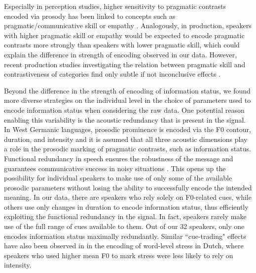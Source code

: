 Especially in perception studies, higher sensitivity to pragmatic contrasts encoded via prosody has been linked to concepts such as pragmatic/communicative skill or empathy \citep{bishopPhonologyPhoneticsSignalextrinsic2020, orricoInfluenceEmpathyAutisticlike2023}. Analogously, in production, speakers with higher pragmatic skill or empathy would be expected to encode pragmatic contrasts more strongly than speakers with lower pragmatic skill, which could explain the difference in strength of encoding observed in our data. However, recent production studies investigating the relation between pragmatic skill and contrastiveness of categories find only subtle if not inconclusive effects \citep{turnbullListenerorientedPhoneticReduction2019, bishopBriefReportAutistic2022}.

Beyond the difference in the strength of encoding of information status, we found more diverse strategies on the individual level in the choice of parameters used to encode information status when considering the raw data. One potential reason enabling this variability is the acoustic redundancy that is present in the signal. In West Germanic languages, prosodic prominence is encoded via the F0 contour, duration, and intensity and it is assumed that all three acoustic dimensions play a role in the prosodic marking of pragmatic contrasts, such as information status. Functional redundancy in speech ensures the robustness of the message and guarantees communicative success in noisy situations \citep{winterSpokenLanguageAchieves2014}. This opens up the possibility for individual speakers to make use of only some of the available prosodic parameters without losing the ability to successfully encode the intended meaning. In our data, there are speakers who rely solely on F0-related cues, while others use only changes in duration to encode information status, thus efficiently exploiting the functional redundancy in the signal. In fact, speakers rarely make use of the full range of cues available to them. Out of our 32 speakers, only one encodes information status maximally redundantly. Similar ``cue-trading" effects have also been observed in \citet{severijnenYourVOORnaamNot2024} in the encoding of word-level stress in Dutch, where speakers who used higher mean F0 to mark stress were less likely to rely on intensity.

